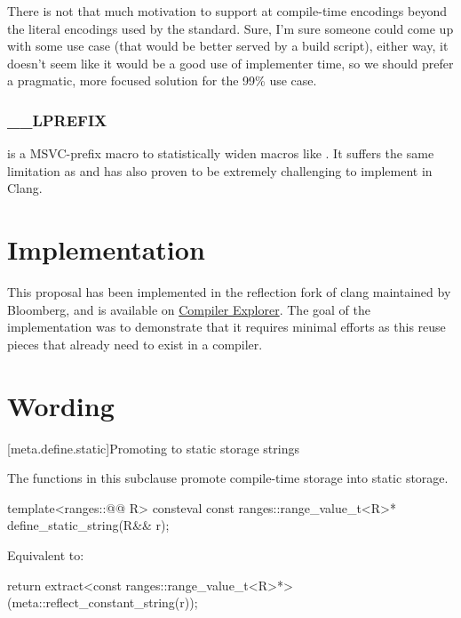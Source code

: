 \documentclass{wg21}
\begin{document}
There is not that much motivation to support at compile-time encodings beyond the literal encodings used by the standard.
Sure, I'm sure someone could come up with some use case (that would be better served by a build script), either way, it doesn't seem like it
would be a good use of implementer time, so we should prefer a pragmatic, more focused solution for the 99\% use case.

\subsubsection{__LPREFIX}

 is a MSVC-prefix macro to statistically widen macros like .
It suffers the same limitation as  and has also proven to be extremely challenging to implement in Clang.


\section{Implementation}

This proposal has been implemented in the reflection fork of clang maintained by Bloomberg, and is available on
\href{https://compiler-explorer.com/z/qen1fvafq}{Compiler Explorer}.
The goal of the implementation was to demonstrate that it requires minimal efforts as this reuse pieces that already need to exist in a compiler.

\section{Wording}


[meta.define.static]{Promoting to static storage strings}



\pnum
The functions in this subclause promote compile-time storage into static storage.

%
\begin{itemdecl}
template<ranges::@@ R>
consteval const ranges::range_value_t<R>* define_static_string(R&& r);
\end{itemdecl}

\begin{itemdescr}
\pnum
\effects
Equivalent to:
\begin{codeblock}
    return extract<const ranges::range_value_t<R>*>(meta::reflect_constant_string(r));
\end{codeblock}
\end{itemdescr}
\end{document}
